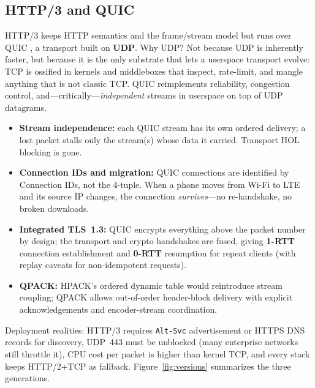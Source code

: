 \subsection{HTTP/3 and QUIC}

HTTP/3 \cite{rfc9114} keeps HTTP semantics and the frame/stream model but runs over QUIC \cite{rfc9000}, a transport built on \textbf{UDP}. Why UDP? Not because UDP is inherently faster, but because it is the only substrate that lets a userspace transport evolve: TCP is ossified in kernels and middleboxes that inspect, rate-limit, and mangle anything that is not classic TCP. QUIC reimplements reliability, congestion control, and---critically---\emph{independent} streams in userspace on top of UDP datagrams.

\begin{itemize}
  \item \textbf{Stream independence:} each QUIC stream has its own ordered delivery; a lost packet stalls only the stream(s) whose data it carried. Transport HOL blocking is gone.
  \item \textbf{Connection IDs and migration:} QUIC connections are identified by Connection IDs, not the 4-tuple. When a phone moves from Wi-Fi to LTE and its source IP changes, the connection \emph{survives}---no re-handshake, no broken downloads.
  \item \textbf{Integrated TLS~1.3:} QUIC encrypts everything above the packet number by design; the transport and crypto handshakes are fused, giving \textbf{1-RTT} connection establishment and \textbf{0-RTT} resumption for repeat clients (with replay caveats for non-idempotent requests).
  \item \textbf{QPACK:} HPACK's ordered dynamic table would reintroduce stream coupling; QPACK allows out-of-order header-block delivery with explicit acknowledgements and encoder-stream coordination.
\end{itemize}

Deployment realities: HTTP/3 requires \texttt{Alt-Svc} advertisement or HTTPS DNS records for discovery, UDP~443 must be unblocked (many enterprise networks still throttle it), CPU cost per packet is higher than kernel TCP, and every stack keeps HTTP/2+TCP as fallback. Figure~\ref{fig:versions} summarizes the three generations.

